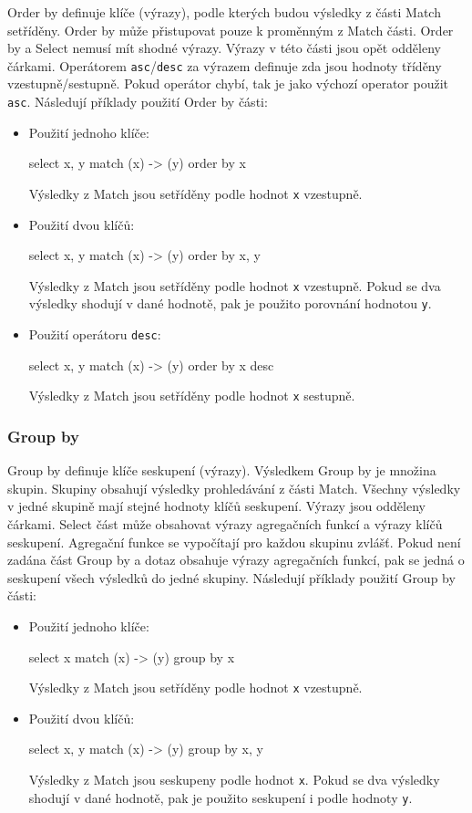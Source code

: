 Order by definuje klíče (výrazy), podle kterých budou výsledky z části Match setříděny.
Order by může přistupovat pouze k proměnným z Match části.
Order by a Select nemusí mít shodné výrazy.
Výrazy v této části jsou opět odděleny čárkami.
Operátorem \texttt{asc}/\texttt{desc} za výrazem definuje zda jsou hodnoty tříděny vzestupně/sestupně.
Pokud operátor chybí, tak je jako výchozí operator použit \texttt{asc}.
Následují příklady použití Order by části:
\begin{itemize}
\item
Použití jednoho klíče:
\begin{code}
select x, y match (x) -> (y) order by x
\end{code}
Výsledky z Match jsou setříděny podle hodnot \texttt{x} vzestupně.

\item
Použití dvou klíčů:
\begin{code}
select x, y match (x) -> (y) order by x, y
\end{code}
Výsledky z Match jsou setříděny podle hodnot \texttt{x} vzestupně.
Pokud se dva výsledky shodují v dané hodnotě, pak je použito porovnání hodnotou \texttt{y}.

\item
Použití operátoru \texttt{desc}:
\begin{code}
select x, y match (x) -> (y) order by x desc
\end{code}
Výsledky z Match jsou setříděny podle hodnot \texttt{x} sestupně.
\end{itemize}

\subsubsection{Group by}

Group by definuje klíče seskupení (výrazy).
Výsledkem Group by je množina skupin.
Skupiny obsahují výsledky prohledávání z části Match.
Všechny výsledky v jedné skupině mají stejné hodnoty klíčů seskupení. 
Výrazy jsou odděleny čárkami.
Select část může obsahovat výrazy agregačních funkcí a výrazy klíčů seskupení.
Agregační funkce se vypočítají pro každou skupinu zvlášť.
Pokud není zadána část Group by a dotaz obsahuje výrazy agregačních funkcí, pak se jedná o seskupení všech výsledků do jedné skupiny.
Následují příklady použití Group by části:
\begin{itemize}
\item
Použití jednoho klíče:
\begin{code}
select x match (x) -> (y) group by x
\end{code}
Výsledky z Match jsou setříděny podle hodnot \texttt{x} vzestupně.

\item
Použití dvou klíčů:
\begin{code}
select x, y match (x) -> (y) group by x, y
\end{code}
Výsledky z Match jsou seskupeny podle hodnot \texttt{x}.
Pokud se dva výsledky shodují v dané hodnotě, pak je použito seskupení i podle hodnoty \texttt{y}.
\end{itemize}